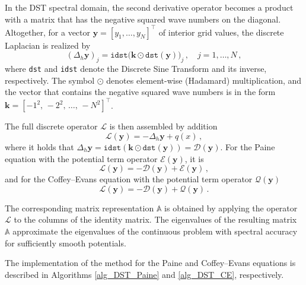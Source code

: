 \documentclass[11pt,a4paper,oneside,openright]{report} %
\begin{document}
In the DST spectral domain, the second derivative operator becomes a product with a matrix that has the negative squared wave numbers on the diagonal. Altogether, for a vector $\boldsymbol{y} = [y_1, \dots, y_N ]^\top$ of interior grid values, the discrete Laplacian is realized by
\begin{equation}
    (\Delta_h \boldsymbol{y})_j = \texttt{idst}\bigl(\boldsymbol{k} \odot \texttt{dst}(\boldsymbol{y})\bigr)_j \, , \quad j = 1,\dots,N \, ,
\end{equation}
where \texttt{dst} and \texttt{idst} denote the Discrete Sine Transform and its inverse, respectively. The symbol $\odot$ denotes element-wise (Hadamard) multiplication, and the vector that contains the negative squared wave numbers is in the form $\boldsymbol{k} = [-1^2, \, -2^2, \, \dots, \, -N^2 ]^\top$.

The full discrete operator $\mathcal{L}$ is then assembled by addition
\begin{equation}
    \mathcal{L}(\boldsymbol{y}) = -\Delta_h \boldsymbol{y} + q(x) \, ,
\end{equation}
where it holds that $\Delta_h \boldsymbol{y} = \texttt{idst}(\boldsymbol{k} \odot \texttt{dst}(\boldsymbol{y})) = \mathcal{D}(\boldsymbol{y})$. For the Paine equation with the potential term operator $\mathcal{E}(\boldsymbol{y})$, it is
\begin{equation}
    \mathcal{L}(\boldsymbol{y}) = - \mathcal{D}(\boldsymbol{y}) + \mathcal{E}(\boldsymbol{y}) \, ,
\end{equation}
and for the Coffey--Evans equation with the potential term operator $\mathcal{Q}(\boldsymbol{y})$
\begin{equation}
    \mathcal{L}(\boldsymbol{y}) = -\mathcal{D}(\boldsymbol{y}) + \mathcal{Q}(\boldsymbol{y}) \, .
\end{equation}


The corresponding matrix representation $\mathbb{A}$ is obtained by applying the operator~$\mathcal{L}$ to the columns of the identity matrix. The eigenvalues of the resulting matrix $\mathbb{A}$ approximate the eigenvalues of the continuous problem with spectral accuracy for sufficiently smooth potentials.

The implementation of the method for the Paine and Coffey--Evans equations is described in Algorithms \ref{alg_DST_Paine} and \ref{alg_DST_CE}, respectively.
\end{document}

